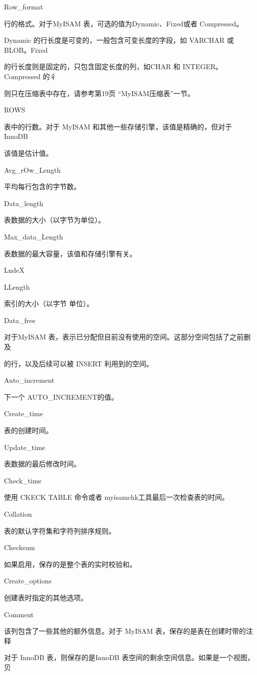 Row\_format

行的格式。对于MyISAM 表，可选的值为Dynamic、Fixed或者 Compressed。

Dynamic 的行长度是可变的，一般包含可变长度的字段，如 VARCHAR 或BLOB。Fixed

的行长度则是固定的，只包含固定长度的列，如CHAR 和 INTEGER。Compressed 的彳

则只在压缩表中存在，请参考第19页 “MyISAM压缩表”一节。

ROWS

表中的行数。对于 MyISAM 和其他一些存储引擎，该值是精确的，但对于 InnoDB

该值是估计值。

Avg\_rOw\_Length

平均每行包含的字节数。

Data\_length

表数据的大小（以字节为单位）。

Max\_data\_Length

表数据的最大容量，该值和存储引擎有关。

LndeX

LLength

索引的大小（以字节 单位）。

Data\_free

对于MyISAM 表，表示已分配但目前没有使用的空间。这部分空间包括了之前删及

的行，以及后续可以被 INSERT 利用到的空间。

Auto\_increment

下一个 AUTO\_INCREMENT的值。

Create\_time

表的创建时间。

Update\_time

表数据的最后修改时间。

Check\_time

使用 CKECK TABLE 命令或者 myisamchk工具最后一次检查表的时间。

Collation

表的默认字符集和字符列排序规则。

Checksum

如果启用，保存的是整个表的实时校验和。

Create\_options

创建表时指定的其他选项。

Comment

该列包含了一些其他的额外信息。对于 MyISAM 表，保存的是表在创建时带的注释

对于 InnoDB 表，则保存的是InnoDB 表空间的剩余空间信息。如果是一个视图，贝

